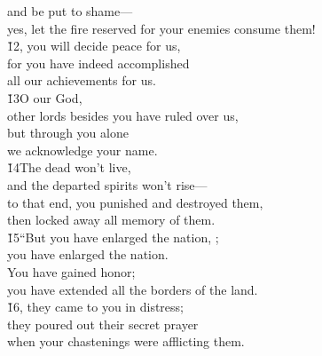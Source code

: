 \begin{poetry}
\poemll    and be put to shame--- \\
\poemlll       yes, let the fire reserved for your enemies consume them! \\
\poeml \v{12}, you will decide peace for us, \\
\poemll    for you have indeed accomplished \\
\poemlll       all our achievements for us. \\
\poeml \v{13}O  our God, \\
\poemll    other lords besides you have ruled over us, \\
\poeml but through you alone \\
\poemll    we acknowledge your name. \\
\poeml \v{14}The dead won't live, \\
\poemll    and the departed spirits won't rise--- \\
\poeml to that end, you punished and destroyed them, \\
\poemll    then locked away all memory of them. \\
\poeml \v{15}``But you have enlarged the nation, ; \\
\poemll    you have enlarged the nation. \\
\poeml You have gained honor; \\
\poemll    you have extended all the borders of the land. \\
\poeml \v{16}, they came to you in distress; \\
\poemll    they poured out their secret prayer \\
\poemlll       when your chastenings were afflicting them. \\

\end{poetry}
